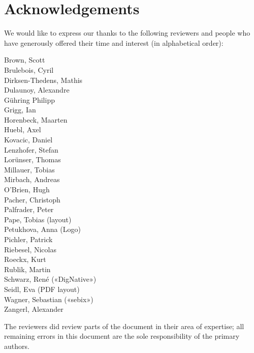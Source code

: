 \clearpage
\section*{Acknowledgements}
\label{section:Reviewers}

We would like to express our thanks to the following reviewers and people who have generously offered their time and interest (in alphabetical order):

\begin{multicols}{2}{\parskip=0pt\centering\obeylines%
Brown, Scott \\
Brulebois, Cyril \\
Dirksen-Thedens, Mathis \\
Dulaunoy, Alexandre \\
Gühring Philipp  \\
Grigg, Ian  \\
Horenbeck, Maarten \\
Huebl, Axel \\
Kovacic, Daniel \\
Lenzhofer, Stefan \\
Lorünser, Thomas \\
Millauer, Tobias \\
Mirbach, Andreas \\ 
O'Brien, Hugh \\
Pacher, Christoph \\
Palfrader, Peter \\
Pape, Tobias (layout) \\
Petukhova, Anna (Logo) \\
Pichler, Patrick \\
Riebesel, Nicolas \\
Roeckx, Kurt \\
Rublik, Martin \\
Schwarz, René («DigNative») \\
Seidl, Eva (PDF layout) \\
Wagner, Sebastian («sebix») \\
Zangerl, Alexander \\
}\end{multicols}





The reviewers did review parts of the document in their area of
expertise; all remaining errors in this document are the sole
responsibility of the primary authors.





